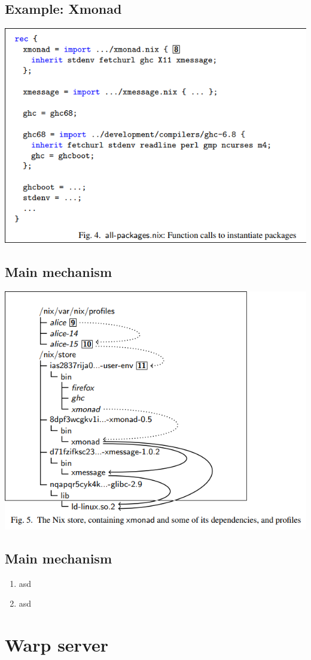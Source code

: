 \documentclass[11pt]{article}
\begin{document}
\subsection{Example: Xmonad}
\label{sec:org0dff7e9}
\begin{center}
\includegraphics[width=.9\linewidth]{./images/screenshot-07.png}
\end{center}
\subsection{Main mechanism}
\label{sec:org6e14597}
\begin{center}
\includegraphics[width=.9\linewidth]{./images/screenshot-08.png}
\end{center}
\subsection{Main mechanism}
\label{sec:org61e2e5c}
\begin{enumerate}
\item asd
\item asd
\end{enumerate}
\section{Warp server}
\label{sec:org4723898}
\end{document}
